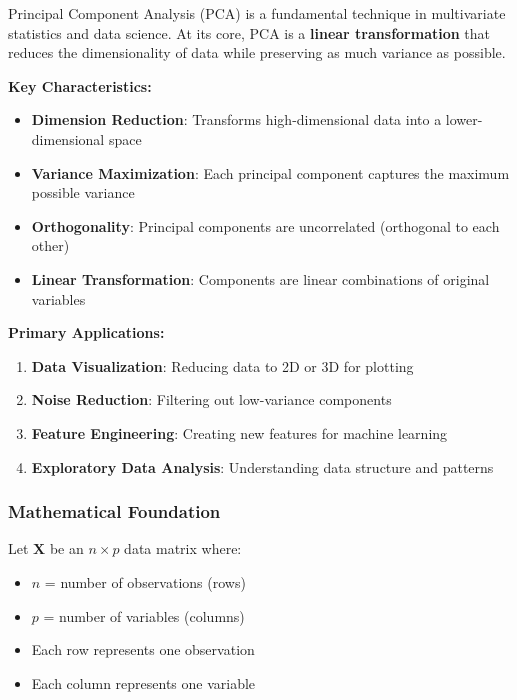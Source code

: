 \documentclass[
]{article}
\begin{document}
Principal Component Analysis (PCA) is a fundamental technique in
multivariate statistics and data science. At its core, PCA is a
\textbf{linear transformation} that reduces the dimensionality of data
while preserving as much variance as possible.

\textbf{Key Characteristics:}

\begin{itemize}
\item
  \textbf{Dimension Reduction}: Transforms high-dimensional data into a
  lower-dimensional space
\item
  \textbf{Variance Maximization}: Each principal component captures the
  maximum possible variance
\item
  \textbf{Orthogonality}: Principal components are uncorrelated
  (orthogonal to each other)
\item
  \textbf{Linear Transformation}: Components are linear combinations of
  original variables
\end{itemize}

\textbf{Primary Applications:}

\begin{enumerate}
\item
  \textbf{Data Visualization}: Reducing data to 2D or 3D for plotting
\item
  \textbf{Noise Reduction}: Filtering out low-variance components
\item
  \textbf{Feature Engineering}: Creating new features for machine
  learning
\item
  \textbf{Exploratory Data Analysis}: Understanding data structure and
  patterns
\end{enumerate}

\subsubsection{Mathematical Foundation}

Let \(\mathbf{X}\) be an \(n \times p\) data matrix where:

\begin{itemize}
\item
  \(n\) = number of observations (rows)
\item
  \(p\) = number of variables (columns)
\item
  Each row represents one observation
\item
  Each column represents one variable
\end{itemize}
\end{document}
